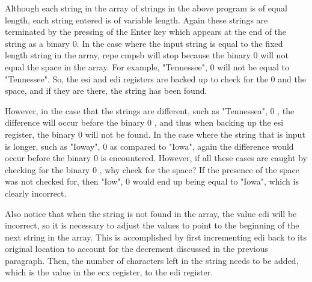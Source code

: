 \documentclass[10pt]{book}
\begin{document}
\begin{center}
\begin{center}
\begin{center}
\begin{center}
Although each string in the array of strings in the above program is of equal length, each string entered is of variable length. Again these strings are terminated by the pressing of the Enter key which appears at the end of the string as a binary 0. In the case where the input string is equal to the fixed length string in the array, repe cmpsb will stop because the binary 0 will not equal the space in the array. For example, "Tennessee", 0 will not be equal to "Tennessee". So, the esi and edi registers are backed up to check for the 0 and the space, and if they are there, the string has been found.


However, in the case that the strings are different, such as "Tennessea", 0 , the difference will occur before the binary 0 , and thus when backing up the esi register, the binary 0 will not be found. In the case where the string that is input is longer, such as "Ioway", 0 as compared to "Iowa", again the difference would occur before the binary 0 is encountered. However, if all these cases are caught by checking for the binary 0 , why check for the space? If the presence of the space was not checked for, then "Iow", 0 would end up being equal to "Iowa", which is clearly incorrect.

Also notice that when the string is not found in the array, the value edi will be incorrect, so it is necessary to adjust the values to point to the beginning of the next string in the array. This is accomplished by first incrementing edi back to its original location to account for the decrement discussed in the previous paragraph. Then, the number of characters left in the string needs to be added, which is the value in the ecx register, to the edi register.


\end{center}
\end{center}
\end{center}
\end{center}
\end{document}
